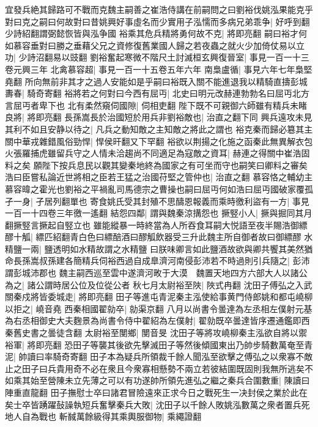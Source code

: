 宜發兵絶其歸路可不戰而克魏主嗣善之崔浩侍講在前嗣問之曰劉裕伐姚泓果能克乎對曰克之嗣曰何故對曰昔姚興好事虛名而少實用子泓懦而多病兄弟乖争|{
	好呼到翻少詩紹翻謂弼懿恢皆與泓争國}
裕乘其危兵精將勇何故不克|{
	將即亮翻}
嗣曰裕才何如慕容垂對曰勝之垂藉父兄之資修復舊業國人歸之若夜蟲之就火少加倚仗易以立功|{
	少詩沼翻易以豉翻}
劉裕奮起寒微不階尺土討滅桓玄興復晉室|{
	事見一百一十三卷元興三年}
北禽慕容超|{
	事見一百一十五卷五年六年}
南梟盧循|{
	事見六年七年梟堅堯翻}
所向無前非其才之過人安能如是乎嗣曰裕既入關不能進退我以精騎直擣彭城夀春|{
	騎奇寄翻}
裕將若之何對曰今西有屈丏|{
	北史曰明元改赫連勃勃名曰屈丏北方言屈丏者卑下也}
北有柔然窺伺國隙|{
	伺相吏翻}
陛下既不可親御六師雖有精兵未睹良將|{
	將即亮翻}
長孫嵩長於治國短於用兵非劉裕敵也|{
	治直之翻下同}
興兵遠攻未見其利不如且安静以待之|{
	凡兵之動知敵之主知敵之將此之謂也}
裕克秦而歸必簒其主關中華戎雜錯風俗勁悍|{
	悍侯旰翻又下罕翻}
裕欲以荆揚之化施之函秦此無異解衣包火張羅捕虎雖留兵守之人情未洽趨尚不同適足為寇敵之資耳|{
	赫連之得關中崔浩固料之矣}
願陛下按兵息民以觀其變秦地終為國家之有可坐而守也嗣笑曰卿料之審矣浩曰臣嘗私論近世將相之臣若王猛之治國苻堅之管仲也|{
	治直之翻}
慕容恪之輔幼主慕容暐之霍光也劉裕之平禍亂司馬德宗之曹操也嗣曰屈丏何如浩曰屈丏國破家覆孤孑一身|{
	孑居列翻單也}
寄食姚氏受其封殖不思醻恩報義而乘時徼利盜有一方|{
	事見一百一十四卷三年徼一遙翻}
結怨四鄰|{
	謂與魏秦涼搆怨也}
撅竪小人|{
	撅與掘同其月翻撅竪言撅起自竪立也}
雖能縱暴一時終當為人所吞食耳嗣大悦語至夜半賜浩御縹醪十觚|{
	縹匹紹翻青白色曰縹醅酒曰醪觚飲器受三升此魏主所自御者故曰御縹醪}
水精鹽一兩|{
	鹽透明如水精故謂之水精鹽}
曰朕味卿言如此鹽酒故欲與卿共饗其美然猶命長孫嵩叔孫建各簡精兵伺裕西過自成臯濟河南侵彭沛若不時過則引兵隨之|{
	彭沛謂彭城沛郡也}
魏主嗣西巡至雲中遂濟河畋于大漠　魏置天地四方六部大人以諸公為之|{
	諸公謂時居公位及位從公者}
秋七月太尉裕至陜|{
	陜式冉翻}
沈田子傅弘之入武關秦戍將皆委城走|{
	將即亮翻}
田子等進屯青泥秦主泓使給事黄門侍郎姚和都屯嶢柳以拒之|{
	嶢音堯}
西秦相國翟勍卒|{
	勍渠京翻}
八月以尚書令曇達為左丞相左僕射元基為右丞相御史大夫麴景為尚書令侍中翟紹為左僕射|{
	翟勍既卒曇達皆序遷通鑑即西秦舊史書之曇徒含翻}
太尉裕至閺鄉|{
	閺音旻}
沈田子等將攻嶢柳秦主泓欲自將以禦裕軍|{
	將即亮翻}
恐田子等襲其後欲先擊滅田子等然後傾國東出乃帥步騎數萬奄至青泥|{
	帥讀曰率騎奇寄翻}
田子本為疑兵所領裁千餘人聞泓至欲擊之傅弘之以衆寡不敵止之田子曰兵貴用奇不必在衆且今衆寡相懸勢不兩立若彼結圍既固則我無所逃矣不如乘其始至營陳未立先薄之可以有功遂帥所領先進弘之繼之秦兵合圍數重|{
	陳讀曰陣重直龍翻}
田子撫慰士卒曰諸君冒險遠來正求今日之戰死生一决封侯之業於此在矣士卒皆踴躍鼔譟執短兵奮擊秦兵大敗|{
	沈田子以千餘人敗姚泓數萬之衆者置兵死地人自為戰也}
斬馘萬餘級得其乘輿服御物|{
	乘繩證翻}
